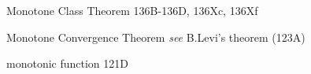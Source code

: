 




























































Monotone Class Theorem 136B-136D, 
136Xc, 136Xf

Monotone Convergence Theorem {\it see} B.Levi's theorem (123A)



monotonic function 121D






















\indexmedskip
























